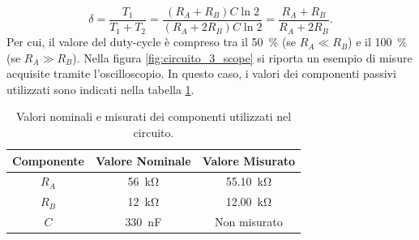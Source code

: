 \begin{equation}
	\delta=\frac{T_1}{T_1+T_2}=\frac{\left(R_A+R_B\right)C\ln{2}}{\left(R_A+2R_B\right)C\ln{2}}=\frac{R_A+R_B}{R_A+2R_B}.
	\label{eq:3_1}
\end{equation}
Per cui, il valore del duty-cycle è compreso tra il \SI{50}{\percent} (se $R_A\ll R_B$) e il \SI{100}{\percent} (se $R_A \gg R_B$). 
\noindent
Nella figura \ref{fig:circuito_3_scope} si riporta un esempio di misure acquisite tramite l'oscilloscopio. In questo caso, i valori dei componenti passivi utilizzati sono indicati nella tabella \ref{tab:valori_componenti_4}.
\def\arraystretch{1.3}
\begin{table}[b!]
	\centering
	\begin{tabular}{|c|c|c|}
		\hline
		Componente	& Valore Nominale & Valore Misurato \\ \hline
		$R_A$ &\SI{56}{\kilo\ohm} & \SI{55.10}{\kilo\ohm} \\ \hline
		$R_B$ &\SI{12}{\kilo\ohm} & \SI{12.00}{\kilo\ohm} \\ \hline
		$C$ & \SI{330}{\nano\farad} & Non misurato \\ \hline
	\end{tabular}
	\caption{Valori nominali e misurati dei componenti utilizzati nel circuito.}
	\label{tab:valori_componenti_4}
\end{table}

